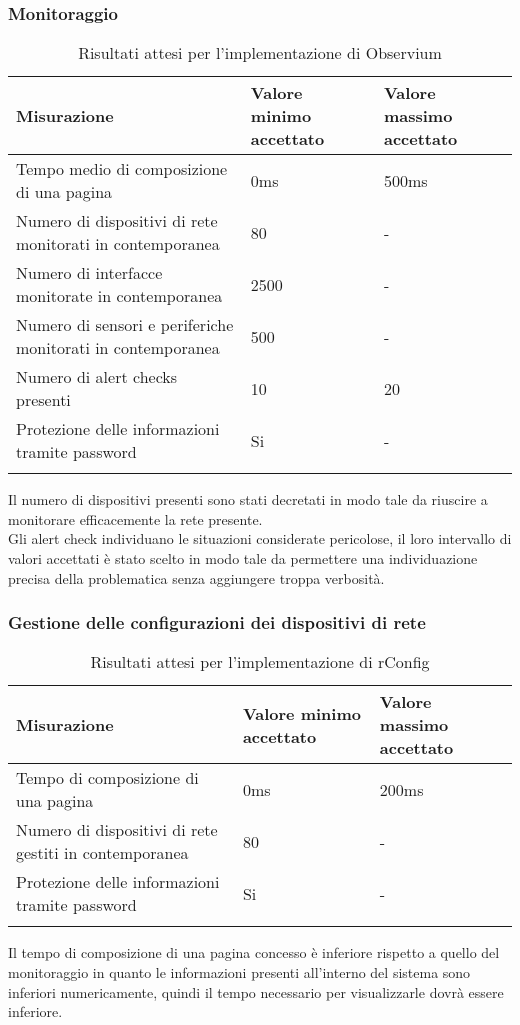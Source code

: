 \documentclass[Tesi.tex]{subfiles}
\begin{document}
\subsubsection{Monitoraggio}
\label{table:Risultati attesi per l'implementazione di Observium}
\renewcommand*{\arraystretch}{1.2}
\begin{longtable}[H]{p{8cm}p{2cm}p{2cm}}
	\rowcolor{CHeader}
	\color{CHeaderText} \textbf{Misurazione} & \color{CHeaderText} \textbf{Valore minimo accettato} & \color{CHeaderText} \textbf{Valore massimo accettato} \\
	\endhead
	Tempo medio di composizione di una pagina
	& 0ms & 500ms \\
	Numero di dispositivi di rete monitorati in contemporanea
	& 80 & - \\
	Numero di interfacce monitorate in contemporanea
	& 2500 & - \\
	Numero di sensori e periferiche monitorati in contemporanea
	& 500 & - \\
	Numero di alert checks presenti
	& 10 & 20 \\
	Protezione delle informazioni tramite password
	& Si & - \\
	\hiderowcolors
	\caption{Risultati attesi per l'implementazione di Observium}
\end{longtable}
Il numero di dispositivi presenti sono stati decretati in modo tale da riuscire a monitorare efficacemente la rete presente.\\
Gli alert check individuano le situazioni considerate pericolose, il loro intervallo di valori accettati è stato scelto in modo tale da permettere una individuazione precisa della problematica senza aggiungere troppa verbosità.

\newpage
\subsubsection{Gestione delle configurazioni dei dispositivi di rete}
\label{table:Risultati attesi per l'implementazione di rConfig}
\renewcommand*{\arraystretch}{1.2}
\begin{longtable}[H]{p{8cm}p{2cm}p{2cm}}
	\rowcolor{CHeader}
	\color{CHeaderText} \textbf{Misurazione} & \color{CHeaderText} \textbf{Valore minimo accettato} & \color{CHeaderText} \textbf{Valore massimo accettato} \\
	\endhead
	Tempo di composizione di una pagina
	& 0ms & 200ms \\
	Numero di dispositivi di rete gestiti in contemporanea
	& 80 & - \\
	Protezione delle informazioni tramite password
	& Si & - \\
	\hiderowcolors
	\caption{Risultati attesi per l'implementazione di rConfig}
\end{longtable}
Il tempo di composizione di una pagina concesso è inferiore rispetto a quello del monitoraggio in quanto le informazioni presenti all'interno del sistema sono inferiori numericamente, quindi il tempo necessario per visualizzarle dovrà essere inferiore.
\end{document}
